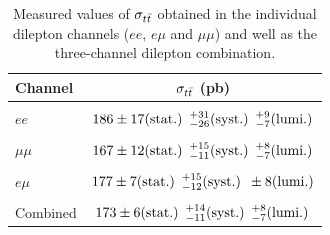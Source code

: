 \begin{table}[htdp]
  \begin{center}
    \begin{tabular}{|l|c|}\hline
      Channel & $\sigma_{\ttbar}$ (pb) \\ 
      \hline
      & \\
      $ee$      & $186 \pm 17  \textrm{(stat.)} \sp {}^{+31}_{-26} \textrm{(syst.)} \sp {}^{+9}_{-7} \textrm{(lumi.)}$ \\ 
      & \\
      $\mu\mu$  & $167 \pm 12 \textrm{(stat.)}  \sp {}^{+15}_{-11} \textrm{(syst.)} \sp {}^{+8}_{-7} \textrm{(lumi.)}$ \\ 
      & \\
      $e\mu$    & $177 \pm 7  \textrm{(stat.)}  \sp {}^{+15}_{-12} \textrm{(syst.)} \sp \pm 8        \textrm{(lumi.)}$ \\ 
      & \\
      Combined & $173 \pm 6  \textrm{(stat.)}  \sp {}^{+14}_{-11} \textrm{(syst.)} \sp {}^{+8}_{-7} \textrm{(lumi.)}$ \\
      \hline
    \end{tabular}
  \end{center}
  \caption{\label{tab:dilep_results}
    Measured values of $\sigma_{\ttbar}$ obtained in the individual dilepton channels ($ee$, $e \mu$ and $\mu \mu$) and well as the three-channel dilepton combination.}
\end{table}


